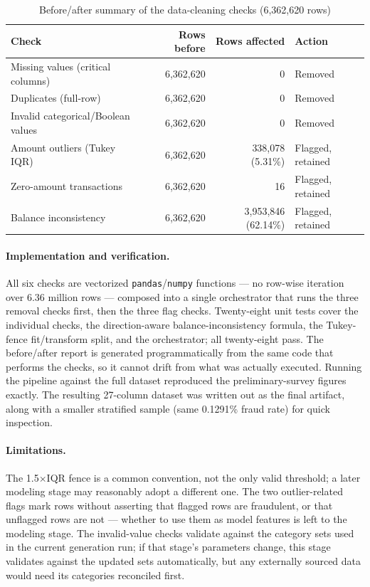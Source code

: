 \begin{table}[htbp]
\centering
\caption{Before/after summary of the data-cleaning checks (6,362,620 rows)}
\label{tab:cleaning-before-after}
\footnotesize
\begin{tabular}{@{}lrrl@{}}
\toprule
\textbf{Check} & \textbf{Rows before} & \textbf{Rows affected} & \textbf{Action} \\
\midrule
Missing values (critical columns) & 6,362,620 & 0 & Removed \\
Duplicates (full-row) & 6,362,620 & 0 & Removed \\
Invalid categorical/Boolean values & 6,362,620 & 0 & Removed \\
Amount outliers (Tukey IQR) & 6,362,620 & 338,078 (5.31\%) & Flagged, retained \\
Zero-amount transactions & 6,362,620 & 16 & Flagged, retained \\
Balance inconsistency & 6,362,620 & 3,953,846 (62.14\%) & Flagged, retained \\
\bottomrule
\end{tabular}
\end{table}

\paragraph{Implementation and verification.} All six checks are vectorized \texttt{pandas}/\texttt{numpy} functions --- no row-wise iteration over 6.36 million rows --- composed into a single orchestrator that runs the three removal checks first, then the three flag checks. Twenty-eight unit tests cover the individual checks, the direction-aware balance-inconsistency formula, the Tukey-fence fit/transform split, and the orchestrator; all twenty-eight pass. The before/after report is generated programmatically from the same code that performs the checks, so it cannot drift from what was actually executed. Running the pipeline against the full dataset reproduced the preliminary-survey figures exactly. The resulting 27-column dataset was written out as the final artifact, along with a smaller stratified sample (same 0.1291\% fraud rate) for quick inspection.

\paragraph{Limitations.} The 1.5\(\times\)IQR fence is a common convention, not the only valid threshold; a later modeling stage may reasonably adopt a different one. The two outlier-related flags mark rows without asserting that flagged rows are fraudulent, or that unflagged rows are not --- whether to use them as model features is left to the modeling stage. The invalid-value checks validate against the category sets used in the current generation run; if that stage's parameters change, this stage validates against the updated sets automatically, but any externally sourced data would need its categories reconciled first.
